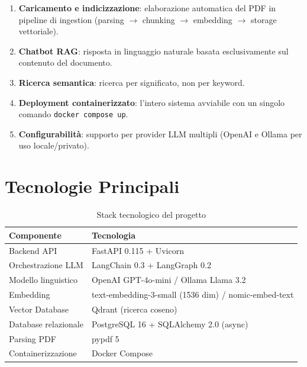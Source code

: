 \begin{enumerate}
  \item \textbf{Caricamento e indicizzazione}: elaborazione automatica del PDF in
        pipeline di ingestion (parsing $\rightarrow$ chunking $\rightarrow$ embedding
        $\rightarrow$ storage vettoriale).
  \item \textbf{Chatbot RAG}: risposta in linguaggio naturale basata esclusivamente
        sul contenuto del documento.
  \item \textbf{Ricerca semantica}: ricerca per significato, non per keyword.
  \item \textbf{Deployment containerizzato}: l'intero sistema avviabile con un
        singolo comando \texttt{docker compose up}.
  \item \textbf{Configurabilità}: supporto per provider LLM multipli (OpenAI e Ollama
        per uso locale/privato).
\end{enumerate}

\section{Tecnologie Principali}

\begin{table}[H]
  \centering
  \begin{tabularx}{\textwidth}{lX}
    \toprule
    \textbf{Componente} & \textbf{Tecnologia} \\
    \midrule
    Backend API       & FastAPI 0.115 + Uvicorn \\
    Orchestrazione LLM & LangChain 0.3 + LangGraph 0.2 \\
    Modello linguistico & OpenAI GPT-4o-mini / Ollama Llama 3.2 \\
    Embedding         & text-embedding-3-small (1536 dim) / nomic-embed-text \\
    Vector Database   & Qdrant (ricerca coseno) \\
    Database relazionale & PostgreSQL 16 + SQLAlchemy 2.0 (async) \\
    Parsing PDF       & pypdf 5 \\
    Containerizzazione & Docker Compose \\
    \bottomrule
  \end{tabularx}
  \caption{Stack tecnologico del progetto}
\end{table}
